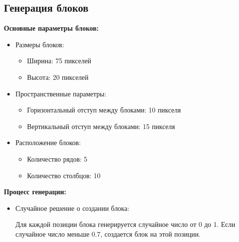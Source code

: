 \subsection{\label{subsec:ch02/sec02/sub03}Генерация блоков}
\textbf{Основные параметры блоков:} 
\begin{itemize}
    \item Размеры блоков:
    \begin{itemize}
        \item Ширина: 75 пикселей
        \item Высота: 20 пикселей
    \end{itemize}

    \item Пространственные параметры:
    \begin{itemize}
        \item Горизонтальный отступ между блоками: 10 пикселя
        \item Вертикальный отступ между блоками: 15 пикселя
    \end{itemize}

    \item Расположение блоков:
    \begin{itemize}
        \item Количество рядов: 5
        \item Количество столбцов: 10
    \end{itemize}
\end{itemize}

\textbf{Процесс генерации:}
    \begin{itemize}
        \item Случайное решение о создании блока:
    
        Для каждой позиции блока генерируется случайное число от 0 до 1. Если случайное число меньше 0.7, создается блок на этой позиции.
    \end{itemize}

